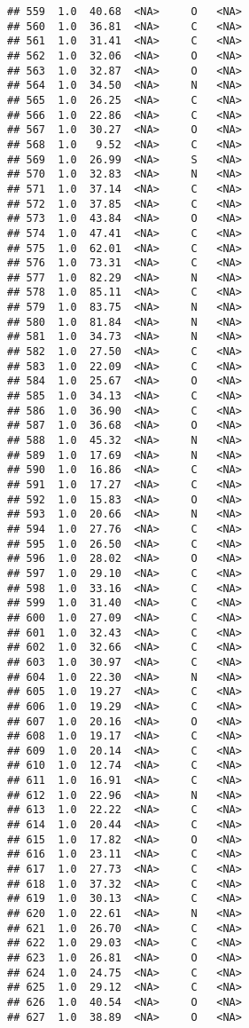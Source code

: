 \documentclass[
]{article}
\begin{document}
\begin{verbatim}
## 559  1.0  40.68  <NA>     O   <NA>
## 560  1.0  36.81  <NA>     C   <NA>
## 561  1.0  31.41  <NA>     C   <NA>
## 562  1.0  32.06  <NA>     O   <NA>
## 563  1.0  32.87  <NA>     O   <NA>
## 564  1.0  34.50  <NA>     N   <NA>
## 565  1.0  26.25  <NA>     C   <NA>
## 566  1.0  22.86  <NA>     C   <NA>
## 567  1.0  30.27  <NA>     O   <NA>
## 568  1.0   9.52  <NA>     C   <NA>
## 569  1.0  26.99  <NA>     S   <NA>
## 570  1.0  32.83  <NA>     N   <NA>
## 571  1.0  37.14  <NA>     C   <NA>
## 572  1.0  37.85  <NA>     C   <NA>
## 573  1.0  43.84  <NA>     O   <NA>
## 574  1.0  47.41  <NA>     C   <NA>
## 575  1.0  62.01  <NA>     C   <NA>
## 576  1.0  73.31  <NA>     C   <NA>
## 577  1.0  82.29  <NA>     N   <NA>
## 578  1.0  85.11  <NA>     C   <NA>
## 579  1.0  83.75  <NA>     N   <NA>
## 580  1.0  81.84  <NA>     N   <NA>
## 581  1.0  34.73  <NA>     N   <NA>
## 582  1.0  27.50  <NA>     C   <NA>
## 583  1.0  22.09  <NA>     C   <NA>
## 584  1.0  25.67  <NA>     O   <NA>
## 585  1.0  34.13  <NA>     C   <NA>
## 586  1.0  36.90  <NA>     C   <NA>
## 587  1.0  36.68  <NA>     O   <NA>
## 588  1.0  45.32  <NA>     N   <NA>
## 589  1.0  17.69  <NA>     N   <NA>
## 590  1.0  16.86  <NA>     C   <NA>
## 591  1.0  17.27  <NA>     C   <NA>
## 592  1.0  15.83  <NA>     O   <NA>
## 593  1.0  20.66  <NA>     N   <NA>
## 594  1.0  27.76  <NA>     C   <NA>
## 595  1.0  26.50  <NA>     C   <NA>
## 596  1.0  28.02  <NA>     O   <NA>
## 597  1.0  29.10  <NA>     C   <NA>
## 598  1.0  33.16  <NA>     C   <NA>
## 599  1.0  31.40  <NA>     C   <NA>
## 600  1.0  27.09  <NA>     C   <NA>
## 601  1.0  32.43  <NA>     C   <NA>
## 602  1.0  32.66  <NA>     C   <NA>
## 603  1.0  30.97  <NA>     C   <NA>
## 604  1.0  22.30  <NA>     N   <NA>
## 605  1.0  19.27  <NA>     C   <NA>
## 606  1.0  19.29  <NA>     C   <NA>
## 607  1.0  20.16  <NA>     O   <NA>
## 608  1.0  19.17  <NA>     C   <NA>
## 609  1.0  20.14  <NA>     C   <NA>
## 610  1.0  12.74  <NA>     C   <NA>
## 611  1.0  16.91  <NA>     C   <NA>
## 612  1.0  22.96  <NA>     N   <NA>
## 613  1.0  22.22  <NA>     C   <NA>
## 614  1.0  20.44  <NA>     C   <NA>
## 615  1.0  17.82  <NA>     O   <NA>
## 616  1.0  23.11  <NA>     C   <NA>
## 617  1.0  27.73  <NA>     C   <NA>
## 618  1.0  37.32  <NA>     C   <NA>
## 619  1.0  30.13  <NA>     C   <NA>
## 620  1.0  22.61  <NA>     N   <NA>
## 621  1.0  26.70  <NA>     C   <NA>
## 622  1.0  29.03  <NA>     C   <NA>
## 623  1.0  26.81  <NA>     O   <NA>
## 624  1.0  24.75  <NA>     C   <NA>
## 625  1.0  29.12  <NA>     C   <NA>
## 626  1.0  40.54  <NA>     O   <NA>
## 627  1.0  38.89  <NA>     O   <NA>

\end{verbatim}
\end{document}
